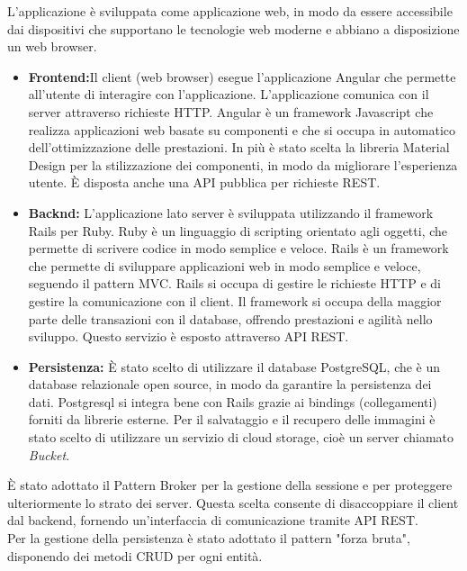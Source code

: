 L’applicazione è sviluppata come applicazione web, in modo da essere accessibile dai dispositivi che supportano le tecnologie web moderne e abbiano a disposizione un web browser.
\begin{itemize}
	\item \large{\textbf{Frontend:}}\newline Il client (web browser) esegue l'applicazione Angular che permette all'utente di interagire con l'applicazione. L'applicazione comunica con il server attraverso richieste HTTP. Angular è un framework Javascript che realizza applicazioni web basate su componenti e che si occupa in automatico dell'ottimizzazione delle prestazioni. In più è stato scelta la libreria Material Design per la stilizzazione dei componenti, in modo da migliorare l'esperienza utente. È disposta anche una API pubblica per richieste REST. 
	\item \large{\textbf{Backnd:}}\newline
	L'applicazione lato server è sviluppata utilizzando il framework Rails per Ruby. Ruby è un linguaggio di scripting orientato agli oggetti, che permette di scrivere codice in modo semplice e veloce. Rails è un framework che permette di sviluppare applicazioni web in modo semplice e veloce, seguendo il pattern MVC. Rails si occupa di gestire le richieste HTTP e di gestire la comunicazione con il client. Il framework si occupa della maggior parte delle transazioni con il database, offrendo prestazioni e agilità nello sviluppo. Questo servizio è esposto attraverso API REST.
	\item \large{\textbf{Persistenza:}}\newline
	È stato scelto di utilizzare il database PostgreSQL, che è un database relazionale open source, in modo da garantire la persistenza dei dati. Postgresql si integra bene con Rails grazie ai bindings (collegamenti) forniti da librerie esterne.
	Per il salvataggio e il recupero delle immagini è stato scelto di utilizzare un servizio di cloud storage, cioè un server chiamato \textit{Bucket}.
\end{itemize}

È stato adottato il Pattern Broker per la gestione della sessione e per proteggere ulteriormente lo strato dei server. Questa scelta consente di disaccoppiare il client dal backend, fornendo un'interfaccia di comunicazione tramite API REST.\\

Per la gestione della persistenza è stato adottato il pattern "forza bruta", disponendo dei metodi CRUD per ogni entità.\\

